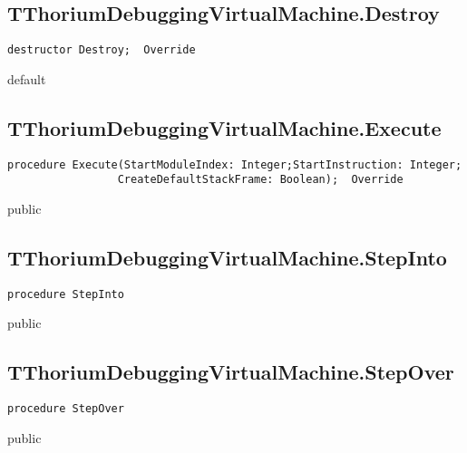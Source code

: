 \subsection{TThoriumDebuggingVirtualMachine.Destroy}
\label{thoriumcorepkg:thorium:tthoriumdebuggingvirtualmachine:destroy}
\begin{FPCList}
\Declaration 

\begin{verbatim}
destructor Destroy;  Override
\end{verbatim}
\Visibility
default
\end{FPCList}
\subsection{TThoriumDebuggingVirtualMachine.Execute}
\label{thoriumcorepkg:thorium:tthoriumdebuggingvirtualmachine:execute}
\begin{FPCList}
\Declaration 

\begin{verbatim}
procedure Execute(StartModuleIndex: Integer;StartInstruction: Integer;
                 CreateDefaultStackFrame: Boolean);  Override
\end{verbatim}
\Visibility
public
\end{FPCList}
\subsection{TThoriumDebuggingVirtualMachine.StepInto}
\label{thoriumcorepkg:thorium:tthoriumdebuggingvirtualmachine:stepinto}
\begin{FPCList}
\Declaration 

\begin{verbatim}
procedure StepInto
\end{verbatim}
\Visibility
public
\end{FPCList}
\subsection{TThoriumDebuggingVirtualMachine.StepOver}
\label{thoriumcorepkg:thorium:tthoriumdebuggingvirtualmachine:stepover}
\begin{FPCList}
\Declaration 

\begin{verbatim}
procedure StepOver
\end{verbatim}
\Visibility
public
\end{FPCList}
